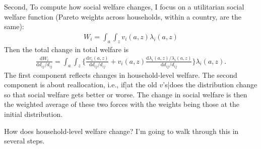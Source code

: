 \documentclass[12pt,pdftex]{article}
\begin{document}
\begin{onehalfspacing}
Second, To compute how social welfare changes, I focus on a utilitarian social welfare function (Pareto weights across households, within a country, are the same):
\begin{align}
W_{i} = \int_{a}\int_{z}  v_{i}(a,z)\lambda_{i}(a,z)
\label{eq:apx-social-welfare}
\end{align}
Then the total change in total welfare is
\begin{align}
\frac{\mathrm{d} W_{i}}{\mathrm{d} d_{ij} / d_{ij}} = \int_{a}\int_{z}  \bigg \{ \frac{\mathrm{d} v_i(a, z)}{\mathrm{d} d_{ij} / d_{ij}}  + v_{i}(a,z) \frac{\mathrm{d} \lambda_{i}(a,z)/ \lambda_{i}(a,z)}{\mathrm{d} d_{ij} / d_{ij}}  \bigg \} \lambda_{i}(a,z).
\label{eq:apx-social-welfare-change}
\end{align}
The first component reflects changes in household-level welfare. The second component is about reallocation, i.e., if|at the old $v$'s|does the distribution change so that social welfare gets better or worse. The change in social welfare is then the weighted average of these two forces with the weights being those at the initial distribution.

How does household-level welfare change? I'm going to walk through this in several steps.


\end{onehalfspacing}
\end{document}
